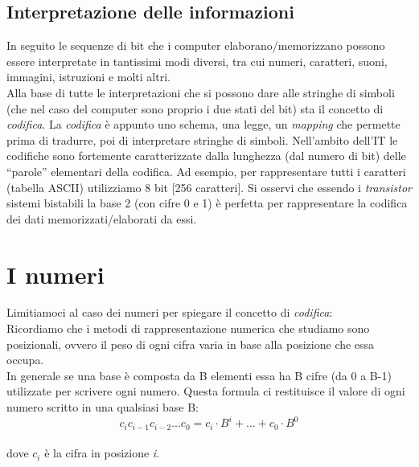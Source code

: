 \documentclass[class=book, crop=false]{standalone}
\begin{document}
\subsection{Interpretazione delle informazioni} In seguito le sequenze di bit che i computer elaborano/memorizzano possono essere interpretate in tantissimi modi diversi, tra cui numeri, caratteri, suoni, immagini, istruzioni e molti altri.\\
Alla base di tutte le interpretazioni che si possono dare alle stringhe di simboli (che nel caso del computer sono proprio i due stati del bit) sta il concetto di \emph{codifica}. La \emph{codifica} è appunto uno schema, una legge, un \emph{mapping} che permette prima di tradurre, poi di interpretare stringhe di simboli.
Nell’ambito dell’IT le codifiche sono fortemente caratterizzate dalla lunghezza (dal numero di bit) delle “parole” elementari della codifica. Ad esempio, per rappresentare tutti i caratteri (tabella ASCII) utilizziamo  8 bit [256 caratteri].
Si osservi che essendo i \emph{transistor} sistemi bistabili la base 2 (con cifre 0 e 1) è perfetta per rappresentare la codifica dei dati memorizzati/elaborati da essi.
\section{I numeri}
Limitiamoci al caso dei numeri per spiegare il concetto di \emph{codifica}:\\
Ricordiamo che i  metodi di rappresentazione numerica che studiamo sono posizionali, ovvero il peso di ogni cifra varia in base alla posizione che essa  occupa.\\
In generale se una base è composta da B elementi essa ha B cifre (da 0 a B-1) utilizzate per scrivere ogni numero.
Questa formula ci restituisce il valore di ogni numero scritto in una qualsiasi base B:\\
\[c_{i} c_{i-1} c_{i-2}... c_{0}=c_{i}\cdot B^{i}+...+c_{0}\cdot B^{0}\]\\
dove $c_{i}$ è la cifra in posizione \emph{i}.
\end{document}

